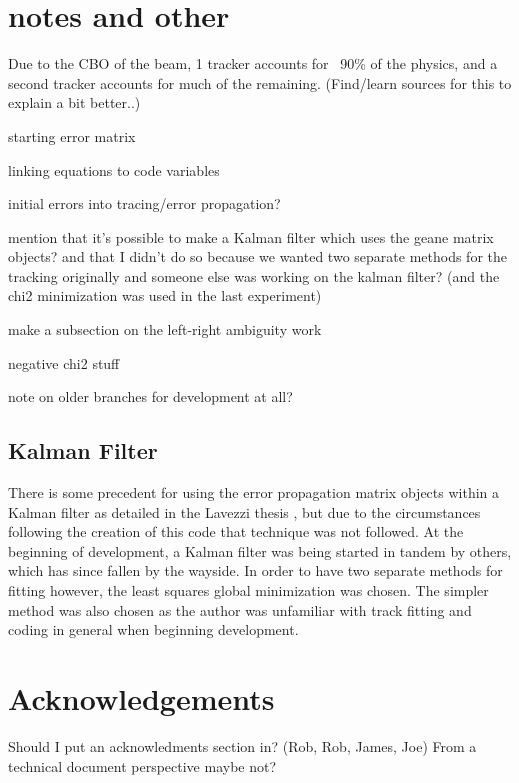 \documentclass{article}
\begin{document}
\printbibliography


\section{notes and other}

 Due to the CBO of the beam, 1 tracker accounts for ~90\% of the physics, and a second tracker accounts for much of the remaining. (Find/learn sources for this to explain a bit better..)

  starting error matrix

  linking equations to code variables

  initial errors into tracing/error propagation?

  mention that it's possible to make a Kalman filter which uses the geane matrix objects? and that I didn't do so because we wanted two separate methods for the tracking originally and someone else was working on the kalman filter? (and the chi2 minimization was used in the last experiment)

  make a subsection on the left-right ambiguity work 

  negative chi2 stuff

  note on older branches for development at all?

  \subsection{Kalman Filter}

    There is some precedent for using the error propagation matrix objects within a Kalman filter as detailed in the Lavezzi thesis \cite{Lavezzi}, but due to the circumstances following the creation of this code that technique was not followed. At the beginning of development, a Kalman filter was being started in tandem by others, which has since fallen by the wayside. In order to have two separate methods for fitting however, the least squares global minimization was chosen. The simpler method was also chosen as the author was unfamiliar with track fitting and coding in general when beginning development.



\section{Acknowledgements}

Should I put an acknowledments section in? (Rob, Rob, James, Joe)
From a technical document perspective maybe not?







\end{document}

